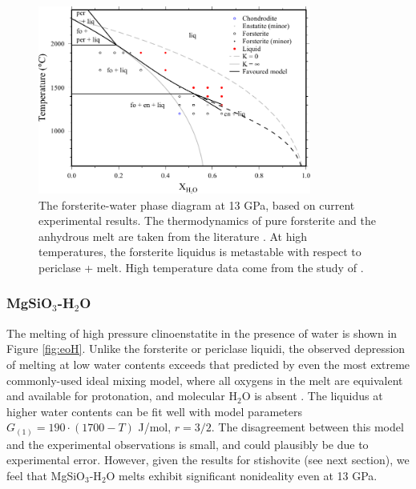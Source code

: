 \documentclass[review]{elsarticle}
\begin{document}
\begin{figure}[ht!]
  \centering
      \includegraphics[width=0.8\textwidth]{figures/forsterite_edited}
      \caption{The forsterite-water phase diagram at 13 GPa, based on current experimental results. The thermodynamics of pure forsterite and the anhydrous melt are taken from the literature \citep{SLB2011, DKS2013}. At high temperatures, the forsterite liquidus is metastable with respect to periclase + melt. High temperature data come from the study of \cite{NDMPMF2016}.}
  \label{fig:foH}
\end{figure}
\clearpage


\subsubsection{MgSiO$_3$-H$_2$O}
The melting of high pressure clinoenstatite in the presence of water is shown in Figure \ref{fig:eoH}. Unlike the forsterite or periclase liquidi, the observed depression of melting at low water contents exceeds that predicted by even the most extreme commonly-used ideal mixing model, where all oxygens in the melt are equivalent and available for protonation, and molecular H$_2$O is absent \citep{SS1985}. The liquidus at higher water contents can be fit well with model parameters $G_{(1)} = 190 \cdot (1700-T)$ J/mol, $r=3/2$. The disagreement between this model and the experimental observations is small, and could plausibly be due to experimental error. However, given the results for stishovite (see next section), we feel that MgSiO$_3$-H$_2$O melts exhibit significant nonideality even at 13 GPa. 
\end{document}

